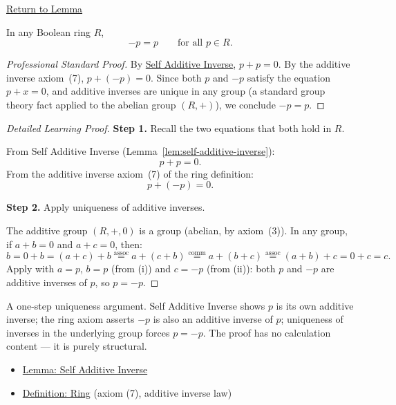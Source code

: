 \newpage
{}
\label{prf:self-negation}

\begin{remark*}[Return]
\hyperref[lem:self-negation]{Return to Lemma}

\end{remark*}

\begin{lemma*}
In any Boolean ring $R$,
\[
-p = p \qquad \text{for all } p \in R.
\]
\end{lemma*}

\begin{proof}[Professional Standard Proof]
\LRAProofBodyStart
By \hyperref[lem:self-additive-inverse]{Self Additive Inverse}, $p + p = 0$.
By the additive inverse axiom~(7), $p + (-p) = 0$.
Since both $p$ and $-p$ satisfy the equation $p + x = 0$, and additive
inverses are unique in any group (a standard group theory fact applied to
the abelian group $(R,+)$), we conclude $-p = p$.
\end{proof}

\begin{proof}[Detailed Learning Proof]
\LRAProofBodyStart

\textbf{Step 1.} Recall the two equations that both hold in $R$.

From Self Additive Inverse (Lemma~\ref{lem:self-additive-inverse}):
\[
p + p = 0. \tag{i}
\]
From the additive inverse axiom~(7) of the ring definition:
\[
p + (-p) = 0. \tag{ii}
\]

\textbf{Step 2.} Apply uniqueness of additive inverses.

The additive group $(R,+,0)$ is a group (abelian, by axiom~(3)). In any
group, if $a + b = 0$ and $a + c = 0$, then:
\[
b = 0 + b = (a + c) + b \overset{\text{assoc}}{=} a + (c + b)
\overset{\text{comm}}{=} a + (b + c) \overset{\text{assoc}}{=} (a+b)+c = 0+c = c.
\]
Apply with $a = p$, $b = p$ (from (i)) and $c = -p$ (from (ii)):
both $p$ and $-p$ are additive inverses of $p$, so $p = -p$.
\end{proof}

\begin{remark*}
A one-step uniqueness argument. Self Additive Inverse shows $p$ is its
own additive inverse; the ring axiom asserts $-p$ is also an additive
inverse of $p$; uniqueness of inverses in the underlying group forces
$p = -p$. The proof has no calculation content --- it is purely structural.
\end{remark*}

\begin{dependencies}
\begin{itemize}
  \item \hyperref[lem:self-additive-inverse]{Lemma: Self Additive Inverse}
  \item \hyperref[def:algebraic-ring]{Definition: Ring} (axiom (7), additive inverse law)
\end{itemize}
\end{dependencies}

\clearpage

